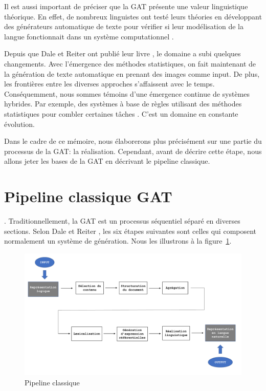Il est aussi important de préciser que la \ac{GAT} présente une valeur linguistique théorique. En effet, de nombreux linguistes ont testé leurs théories en développant des générateurs automatique de texte pour vérifier si leur modélisation de la langue fonctionnait dans un système computationnel \citep{DanlosPresentationmodelegeneration1983}. 

Depuis que Dale et Reiter ont publié leur livre \citep{ReiterBuildingNaturalLanguage2000}, le domaine a subi quelques changements. Avec l'émergence des méthodes statistiques, on fait maintenant de la génération de texte automatique en prenant des images comme input\citep{DBLP:journals/corr/HendricksARDSD16}. De plus, les frontières entre les diverses approches s'affaissent avec le temps. Conséquemment, nous sommes témoins d'une émergence continue de systèmes hybrides. Par exemple, des systèmes à base de règles utilisant des méthodes statistiques pour combler certaines tâches \citep{gatt18}. C'est un domaine en constante évolution.

Dans le cadre de ce mémoire, nous élaborerons plus précisément sur une partie du processus de la \ac{GAT}: la réalisation. Cependant, avant de décrire cette étape, nous allons jeter les bases de la \ac{GAT} en décrivant le pipeline classique.


\section{Pipeline classique GAT} \label{ppc}

. Traditionnellement, la \ac{GAT} est un processus séquentiel séparé en diverses sections. Selon Dale et Reiter \cite{ReiterBuildingNaturalLanguage2000}, les six étapes suivantes sont celles qui composent normalement un système de génération. Nous les illustrons à la figure~\ref{fig:Pipeline}.
\begin{figure}[htb] %
	\centering
	\includegraphics[width=1\textwidth, trim = {0cm 0cm 0cm 0cm},clip]{ch2/figs/pipeline.pdf}
	\caption{Pipeline classique}
	\label{fig:Pipeline}
\end{figure}

